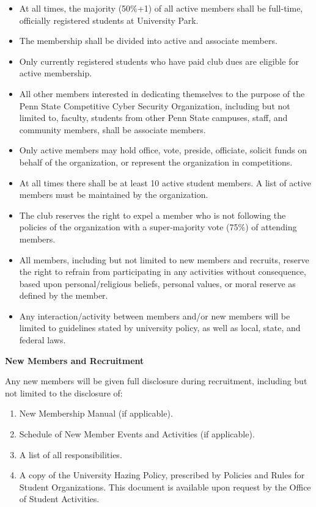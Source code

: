 \documentclass[12pt]{article}
\begin{document}
\begin{itemize}
  \item At all times, the majority (50\%+1) of all active members shall be full-time, officially registered students at University Park.
  \item The membership shall be divided into active and associate members.
  \item Only currently registered students who have paid club dues are eligible for active membership.
  \item All other members interested in dedicating themselves to the purpose of the Penn State Competitive Cyber Security Organization, including but not limited to, faculty, students from other Penn State campuses, staff, and community members, shall be associate members.
  \item Only active members may hold office, vote, preside, officiate, solicit funds on behalf of the organization, or represent the organization in competitions.
  \item At all times there shall be at least 10 active student members. A list of active members must be maintained by the organization.
  \item The club reserves the right to expel a member who is not following the policies of the organization with a super-majority vote (75\%) of attending members.
  \item All members, including but not limited to new members and recruits, reserve the right to refrain from participating in any activities without consequence, based upon personal/religious beliefs, personal values, or moral reserve as defined by the member.
  \item Any interaction/activity between members and/or new members will be limited to guidelines stated by university policy, as well as local, state, and federal laws.
\end{itemize}

\textbf{New Members and Recruitment}

Any new members will be given full disclosure during recruitment, including but not limited to the disclosure of:
\begin{enumerate}
  \item New Membership Manual (if applicable).
  \item Schedule of New Member Events and Activities (if applicable).
  \item A list of all responsibilities.
  \item A copy of the University Hazing Policy, prescribed by Policies and Rules for Student Organizations. This document is available upon request by the Office of Student Activities.
\end{enumerate}
\end{document}
